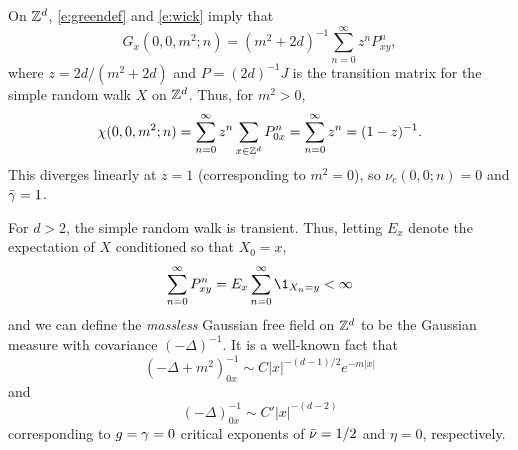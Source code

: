 \begin{example}
\label{ex:gff-asymp}
On ${ {{\mathbb Z}}^d }$, \eqref{e:greendef} and \eqref{e:wick} imply that
\begin{equation}
G_x(0, 0, m^2; n)
	=
(m^2 + 2 d)^{-1} \sum_{n=0}^\infty z^n P^n_{xy},
\end{equation}
where $z = 2 d / (m^2 + 2 d)$ and $P = (2 d)^{-1} J$
is the transition matrix for the simple random walk $X$ on ${ {{\mathbb Z}}^d }$.
Thus, for $m^2 > 0$,
\begin{equation}
\chi(0, 0, m^2; n)
  =
\sum_{n=0}^\infty z^n \sum_{x\in{ {{\mathbb Z}}^d }} P^n_{0x}
  =
\sum_{n=0}^\infty z^n
  =
(1 - z)^{-1}.
\end{equation}
This diverges linearly at $z = 1$ (corresponding to $m^2 = 0$),
so $\nu_c(0, 0; n) = 0$ and $\bar\gamma = 1$.

For $d > 2$, the simple random walk is transient. Thus, letting $E_x$ denote the expectation
of $X$ conditioned so that $X_0 = x$,
\begin{equation}
\sum_{n=0}^\infty P^n_{xy} = E_x \sum_{n=0}^\infty \1_{X_n=y} < \infty
\end{equation}
and we can define the \emph{massless} Gaussian free field on ${ {{\mathbb Z}}^d }$ to be the Gaussian
measure with covariance $(-\Delta)^{-1}$. It is a well-known fact that
\begin{equation}
(-\Delta + m^2)^{-1}_{0x} \sim C |x|^{-(d-1)/2} e^{-m |x|}
\end{equation}
and
\begin{equation}
(-\Delta)^{-1}_{0x} \sim C' |x|^{-(d-2)}
\end{equation}
corresponding to $g = \gamma = 0$ critical exponents of $\bar\nu = 1/2$
and $\eta = 0$, respectively.
\end{example}

